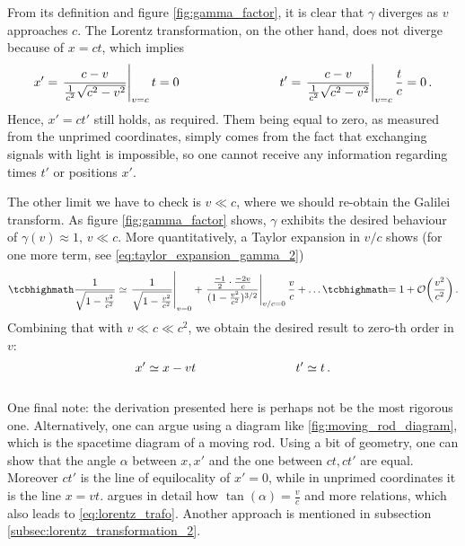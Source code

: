 From its definition and figure \ref{fig:gamma_factor}, it is clear that $\gamma$ diverges as $v$ approaches $c$. The Lorentz transformation, on the other hand, does not diverge because of $x = ct$, which implies
\begin{align*}
	x' = \eval{\frac{c - v}{\frac{1}{c^2} \sqrt{c^2 - v^2}}}_{v = c} t = 0
	\manyqquad
	t' = \eval{\frac{c - v}{\frac{1}{c^2} \sqrt{c^2 - v^2}}}_{v = c} \frac{t}{c} = 0 \, .
\end{align*}
Hence, $x' = ct'$ still holds, as required. Them being equal to zero, as measured from the unprimed coordinates, simply comes from the fact that exchanging signals with light is impossible, so one cannot receive any information regarding times $t'$ or positions $x'$.


The other limit we have to check is $v \ll c$, where we should re-obtain the Galilei transform. As figure \ref{fig:gamma_factor} shows, $\gamma$ exhibits the desired behaviour of $\gamma(v) \approx 1, \, v \ll c$. More quantitatively, a Taylor expansion in $v / c$ shows (for one more term, see \eqref{eq:taylor_expansion_gamma_2})
\begin{equation}\label{eq:taylor_expansion_gamma}
	\eqbox{\frac{1}{\sqrt{1 - \frac{v^2}{c^2}}}} \simeq \eval{\frac{1}{\sqrt{1 - \frac{v^2}{c^2}}}}_{v = 0} + \eval{\frac{\frac{-1}{2} \cdot \frac{-2 v}{c}}{(1 - \frac{v^2}{c^2})^{3/2}}}_{v / c = 0} \frac{v}{c} + \dots \eqbox{= 1 + \mathcal{O}\qty(\frac{v^2}{c^2})} \, .
\end{equation}
Combining that with $v \ll c \ll c^2$, we obtain the desired result to zero-th order in $v$:
\begin{equation*}
	x' \simeq x - vt
	\qquad \qquad \qquad \qquad
	t' \simeq t
	\, .
\end{equation*}\\



One final note: the derivation presented here is perhaps not be the most rigorous one. Alternatively, one can argue using a diagram like \ref{fig:moving_rod_diagram}, which is the spacetime diagram of a moving rod. Using a bit of geometry, one can show that the angle $\alpha$ between $x, x'$ and the one between $ct, ct'$ are equal. Moreover $ct'$ is the line of equilocality of $x' = 0$, while in unprimed coordinates it is the line $x = vt$. \cite{giulini_srt} argues in detail how $\tan(\alpha) = \frac{v}{c}$ and more relations, which also leads to \eqref{eq:lorentz_trafo}. Another approach is mentioned in subsection \ref{subsec:lorentz_transformation_2}.



